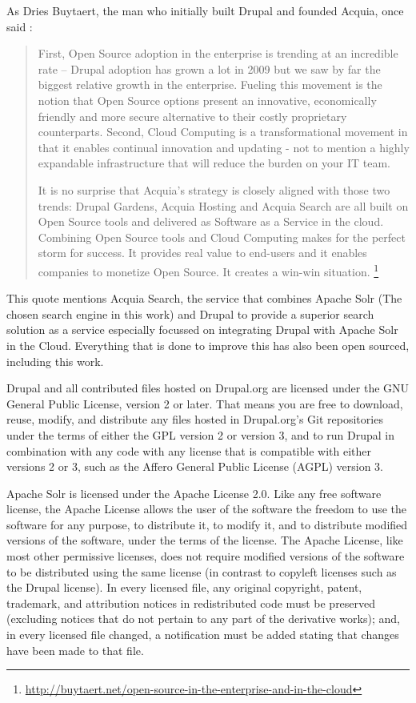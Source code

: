 As Dries Buytaert, the man who initially built Drupal and founded Acquia, once said : 
\begin{quote}First, Open Source adoption in the enterprise is trending at an incredible rate -- Drupal adoption has grown a lot in 2009 but we saw by far the biggest relative growth in the enterprise. Fueling this movement is the notion that Open Source options present an innovative, economically friendly and more secure alternative to their costly proprietary counterparts. Second, Cloud Computing is a transformational movement in that it enables continual innovation and updating - not to mention a highly expandable infrastructure that will reduce the burden on your IT team.

It is no surprise that Acquia's strategy is closely aligned with those two trends: Drupal Gardens, Acquia Hosting and Acquia Search are all built on Open Source tools and delivered as Software as a Service in the cloud. Combining Open Source tools and Cloud Computing makes for the perfect storm for success. It provides real value to end-users and it enables companies to monetize Open Source. It creates a win-win situation. \footnote{\url{http://buytaert.net/open-source-in-the-enterprise-and-in-the-cloud}} \end{quote}

This quote mentions Acquia Search, the service that combines Apache Solr (The chosen search engine in this work) and Drupal to provide a superior search solution as a service especially focussed on integrating Drupal with Apache Solr in the Cloud. Everything that is done to improve this has also been open sourced, including this work.

Drupal and all contributed files hosted on Drupal.org are licensed under the GNU General Public License, version 2 or later. That means you are free to download, reuse, modify, and distribute any files hosted in Drupal.org's Git repositories under the terms of either the GPL version 2 or version 3, and to run Drupal in combination with any code with any license that is compatible with either versions 2 or 3, such as the Affero General Public License (AGPL) version 3. \cite{drupal_license}

Apache Solr is licensed under the Apache License 2.0. Like any free software license, the Apache License allows the user of the software the freedom to use the software for any purpose, to distribute it, to modify it, and to distribute modified versions of the software, under the terms of the license. The Apache License, like most other permissive licenses, does not require modified versions of the software to be distributed using the same license (in contrast to copyleft licenses such as the Drupal license). In every licensed file, any original copyright, patent, trademark, and attribution notices in redistributed code must be preserved (excluding notices that do not pertain to any part of the derivative works); and, in every licensed file changed, a notification must be added stating that changes have been made to that file. \cite{apache_license}
